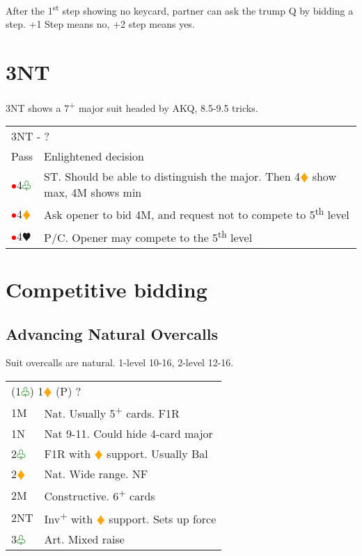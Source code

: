\documentclass{article}
\newcommand{\he}{\textcolor{RubineRed}{$\varheart$}}
\newcommand{\di}{\textcolor{Orange}{$\vardiamond$}}
\newcommand{\cl}{\textcolor{Green}{$\varclub$}}
\newcommand{\nt}{\relsize{-1}NT\relsize{1}}
\newcommand{\up}{\textsuperscript{+}}
\newcommand{\al}{\textcolor{red}{$\bullet$}}
\begin{document}
\medskip

After the 1\textsuperscript{st} step showing no keycard, partner can ask the trump Q by bidding a step. +1 Step means no, +2 step means yes.




\section{3\nt{}}

3\nt{} shows a 7\up{} major suit headed by AKQ, 8.5-9.5 tricks. \\

\begin{tabular}{|l|p{6.5cm}}
	\multicolumn{2}{l}{3\nt{} - ?}\\
	Pass & Enlightened decision \\
	\al{}4\cl{} & ST. Should be able to distinguish the major. Then 4\di{} show max, 4M shows min \\
	\al{}4\di{} & Ask opener to bid 4M, and request not to compete to 5\textsuperscript{th} level \\
	\al{}4\he{} & P/C. Opener may compete to the 5\textsuperscript{th} level \\
\end{tabular}

\section{Competitive bidding}

\subsection{Advancing Natural Overcalls}
Suit overcalls are natural. 1-level 10-16, 2-level 12-16. \\

\begin{tabular}{|l|p{6.5cm}}
	\multicolumn{2}{l}{(1\cl{}) 1\di{} (P) ? } \\
	1M & Nat. Usually 5\up{} cards. F1R \\
	1N & Nat 9-11. Could hide 4-card major \\
	2\cl{} & F1R with \di{} support. Usually Bal \\
	2\di{} & Nat. Wide range. NF \\
	2M & Constructive. 6\up{} cards \\
	2\nt{} & Inv\up{} with \di{} support. Sets up force \\
	3\cl{} & Art. Mixed raise \\
\end{tabular}
\end{document}
